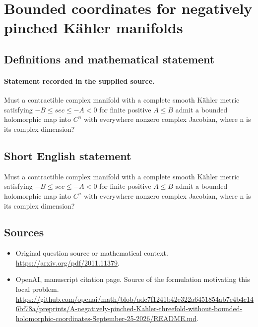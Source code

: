 \documentclass[11pt]{article}
\begin{document}
\section*{Bounded coordinates for negatively pinched Kähler manifolds}\label{statement}
\subsection{Definitions and mathematical statement}
\paragraph{Statement recorded in the supplied source.}
Must a contractible complex manifold with a complete smooth Kähler metric satisfying $-B\leq sec\leq -A<0$ for finite positive $A\leq B$ admit a bounded holomorphic map into $C^{n}$ with everywhere nonzero complex Jacobian, where n is its complex dimension?
\subsection{Short English statement}
Must a contractible complex manifold with a complete smooth Kähler metric satisfying $-B\leq sec\leq -A<0$ for finite positive $A\leq B$ admit a bounded holomorphic map into $C^{n}$ with everywhere nonzero complex Jacobian, where n is its complex dimension?
\subsection{Sources}
\begin{itemize}
\item[S1] Original question source or mathematical context.
\url{https://arxiv.org/pdf/2011.11379}.
\item[S2] OpenAI, manuscript citation page. Source of the formulation motivating this local problem.
\url{https://github.com/openai/math/blob/adc7f1241b42e322a6451854ab7e4b4c146bf78a/preprints/A-negatively-pinched-Kahler-threefold-without-bounded-holomorphic-coordinates-September-25-2026/README.md}.
\end{itemize}
\end{document}
